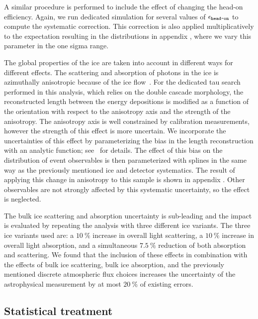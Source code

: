 A similar procedure is performed to include the effect of changing the head-on efficiency.
Again, we run dedicated simulation for several values of $\epsilon_\texttt{head-on}$ to compute the systematic correction.%
This correction is also applied multiplicatively to the expectation resulting in the distributions in appendix , where we vary this parameter in the one sigma range.

The global properties of the ice are taken into account in different ways for different effects.
The scattering and absorption of photons in the ice is azimuthally anisotropic because of the ice flow~\cite{Aartsen:2013rt}.
For the dedicated tau search performed in this analysis, which relies on the double cascade morphology, the reconstructed length between the energy depositions is modified as a function of the orientation with respect to the anisotropy axis and the strength of the anisotropy.
The anisotropy axis is well constrained by calibration measurements, however the strength of this effect is more uncertain.
We incorporate the uncertainties of this effect by parameterizing the bias in the length reconstruction with an analytic function; see~\cite{HESETAU} for details.
The effect of this bias on the distribution of event observables is then parameterized with splines in the same way as the previously mentioned ice and detector systematics.
The result of applying this change in anisotropy to this sample is shown in appendix .
Other observables are not strongly affected by this systematic uncertainty, so the effect is neglected.

The bulk ice scattering and absorption uncertainty is sub-leading and the impact is evaluated by repeating the analysis with three different ice variants.
The three ice variants used are: a $\SI{10}\percent$ increase in overall light scattering, a $\SI{10}\percent$ increase in overall light absorption, and a simultaneous $\SI{7.5}\percent$ reduction of both absorption and scattering.
We found that the inclusion of these effects in combination with the effects of bulk ice scattering, bulk ice absorption, and the previously mentioned discrete atmospheric flux choices increases the uncertainty of the astrophysical measurement by at most $\SI{20}\percent$ of existing errors.

\subsection{Statistical treatment\label{sec:statistics}}

